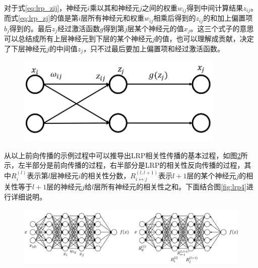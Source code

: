 对于式\ref{eq:lrp_zij}，神经元$i$乘以其和神经元$j$之间的权重$w_{ij}$得到中间计算结果$z_{ij}$。而式\ref{eq:lrp_zj}的值是第$i$层所有神经元和权重$w _{ij}$相乘后得到的$z_{ij}$的和加上偏置项$b_j$得到的。最后$z_j$经过激活函数$g$得到第$j$层某个神经元的值$x_j$。这三个式子的意思可以总结成所有上层神经元到下层的某个神经元$j$的值，也可以理解成贡献，决定了下层神经元$j$的中间值$z_j$，只不过最后要加上偏置项和经过激活函数。

\begin{figure}[h]
	\centering 
	\includegraphics[width=10cm]{fig/ch2/lrp2.png}
	\label{fig:lrp2}
\end{figure}



从以上前向传播的示例过程中可以推导出LRP相关性传播的基本过程，如图\ref{fig:lrp3}所示，左半部分是前向传播的过程，右半部分是LRP的相关性反向传播的过程，其中$R_i^{(l)}$表示第$l$层神经元$i$的相关性分数，$R_{i\leftrightarrow j}^{(l,l+1)}$表示$l+1$层的某个神经元$j$的相关性等于$l+1$层的神经元$j$给$l$层所有神经元的相关性之和。下面结合图\ref{fig:lrp4}进行详细说明。
\begin{figure}[h]
	\centering 
	\includegraphics[width=12cm]{fig/ch2/lrp3.png}
	\label{fig:lrp3}
\end{figure}

